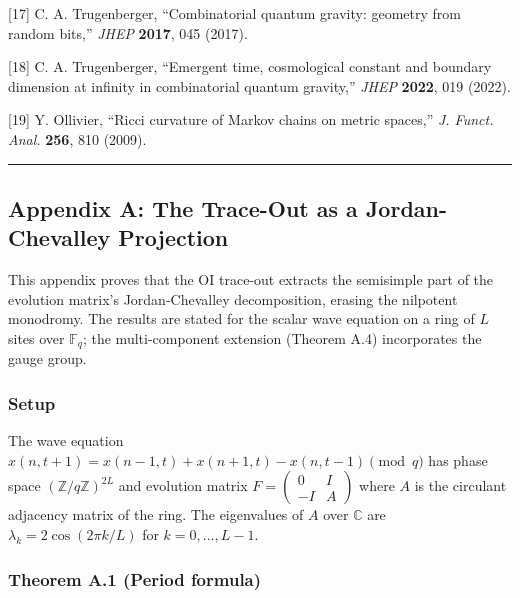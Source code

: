 \documentclass[
  11pt,
]{article}
\begin{document}
{[}17{]} C. A. Trugenberger, ``Combinatorial quantum gravity: geometry
from random bits,'' \emph{JHEP} \textbf{2017}, 045 (2017).

{[}18{]} C. A. Trugenberger, ``Emergent time, cosmological constant and
boundary dimension at infinity in combinatorial quantum gravity,''
\emph{JHEP} \textbf{2022}, 019 (2022).

{[}19{]} Y. Ollivier, ``Ricci curvature of Markov chains on metric
spaces,'' \emph{J. Funct. Anal.} \textbf{256}, 810 (2009).

\begin{center}\rule{0.5\linewidth}{0.5pt}\end{center}

\hypertarget{appendix-a-the-trace-out-as-a-jordan-chevalley-projection}{%
\subsection{Appendix A: The Trace-Out as a Jordan-Chevalley
Projection}\label{appendix-a-the-trace-out-as-a-jordan-chevalley-projection}}

This appendix proves that the OI trace-out extracts the semisimple part
of the evolution matrix's Jordan-Chevalley decomposition, erasing the
nilpotent monodromy. The results are stated for the scalar wave equation
on a ring of \(L\) sites over \(\mathbb{F}_q\); the multi-component
extension (Theorem A.4) incorporates the gauge group.

\hypertarget{setup}{%
\subsubsection{Setup}\label{setup}}

The wave equation
\(x(n, t+1) = x(n-1, t) + x(n+1, t) - x(n, t-1) \pmod{q}\) has phase
space \((\mathbb{Z}/q\mathbb{Z})^{2L}\) and evolution matrix
\(F = \left(\begin{smallmatrix} 0 & I \\ -I & A \end{smallmatrix}\right)\)
where \(A\) is the circulant adjacency matrix of the ring. The
eigenvalues of \(A\) over \(\mathbb{C}\) are
\(\lambda_k = 2\cos(2\pi k/L)\) for \(k = 0, \ldots, L-1\).

\hypertarget{theorem-a.1-period-formula}{%
\subsubsection{Theorem A.1 (Period
formula)}\label{theorem-a.1-period-formula}}
\end{document}
